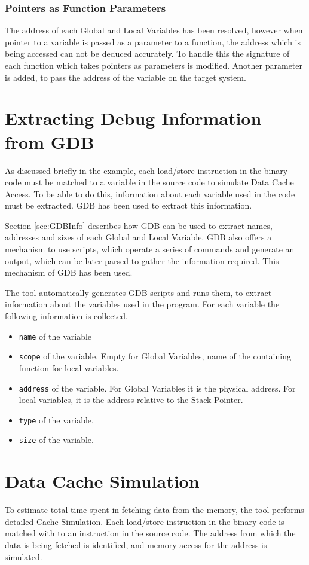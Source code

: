 \subsubsection{Pointers as Function Parameters}
The address of each Global and Local Variables has been resolved, however when pointer to a variable is passed as a parameter to a function, the address which is being accessed can not be deduced accurately. To handle this the signature of each function which takes pointers as parameters is modified. Another parameter is added, to pass the address of the variable on the target system. 

\section{Extracting Debug Information from GDB}
\label{sec:C3GDBInfo}
As discussed briefly in the example, each load/store instruction in the binary code must be matched to a variable in the source code to simulate Data Cache Access. To be able to do this, information about each variable used in the code must be extracted. GDB has been used to extract this information.

Section \ref{sec:GDBInfo} describes how GDB can be used to extract names, addresses and sizes of each Global and Local Variable. GDB also offers a mechanism to use scripts, which operate a series of commands and generate an output, which can be later parsed to gather the information required. This mechanism of GDB has been used.

The tool automatically generates GDB scripts and runs them, to extract information about the variables used in the program. For each variable the following information is collected.

\begin{itemize} \itemsep -6pt
\item \texttt{name} of the variable
\item \texttt{scope} of the variable. Empty for Global Variables, name of the containing function for local variables.
\item \texttt{address} of the variable. For Global Variables it is the physical address. For local variables, it is the address relative to the Stack Pointer.
\item \texttt{type} of the variable.
\item \texttt{size} of the variable.
\end{itemize}

\section{Data Cache Simulation}
To estimate total time spent in fetching data from the memory, the tool performs detailed Cache Simulation. Each load/store instruction in the binary code is matched with to an instruction in the source code. The address from which the data is being fetched is identified, and memory access for the address is simulated. 


